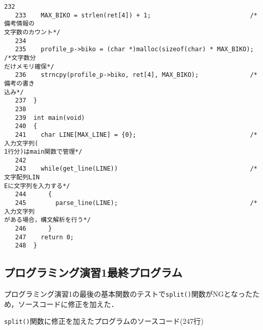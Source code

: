 \begin{Verbatim}[fontsize=\small, baselinestretch=0.8]
   232	
   233	  MAX_BIKO = strlen(ret[4]) + 1;                           /*備考情報の
文字数のカウント*/
   234	
   235	  profile_p->biko = (char *)malloc(sizeof(char) * MAX_BIKO); /*文字数分
だけメモリ確保*/
   236	  strncpy(profile_p->biko, ret[4], MAX_BIKO);              /*備考の書き
込み*/
   237	}
   238	
   239	int main(void)
   240	{
   241	  char LINE[MAX_LINE] = {0};                               /*入力文字列(
1行分)はmain関数で管理*/
   242	
   243	  while(get_line(LINE))                                    /*文字配列LIN
Eに文字列を入力する*/
   244	    {
   245	      parse_line(LINE);                                    /*入力文字列
がある場合，構文解析を行う*/
   246	    }
   247	  return 0;
   248	}
\end{Verbatim}

\subsection{プログラミング演習1最終プログラム}\label{func6}

プログラミング演習1の最後の基本関数のテストで\verb|split()|関数がNGとなったため，ソースコードに修正を加えた．

\verb|split()|関数に修正を加えたプログラムのソースコード(247行)

